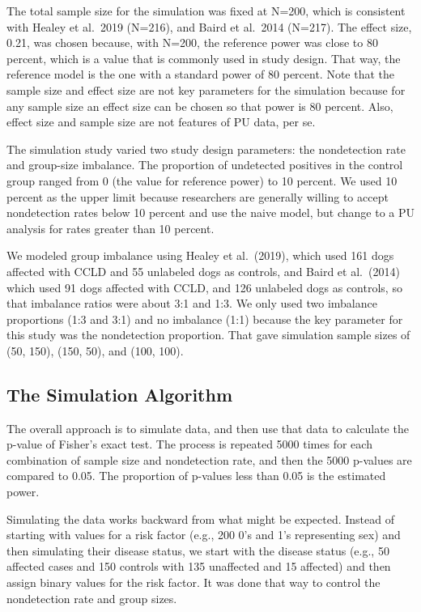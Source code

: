 \documentclass[
]{article}
\begin{document}
The total sample size for the simulation was fixed at N=200, which is
consistent with Healey et al.~2019 (N=216), and Baird et al.~2014
(N=217).\cite{bcioa14, hmhcbhkr19} The effect size, 0.21, was chosen
because, with N=200, the reference power was close to 80 percent, which
is a value that is commonly used in study design. That way, the
reference model is the one with a standard power of 80 percent. Note
that the sample size and effect size are not key parameters for the
simulation because for any sample size an effect size can be chosen so
that power is 80 percent. Also, effect size and sample size are not
features of PU data, per se.

The simulation study varied two study design parameters: the
nondetection rate and group-size imbalance. The proportion of undetected
positives in the control group ranged from 0 (the value for reference
power) to 10 percent. We used 10 percent as the upper limit because
researchers are generally willing to accept nondetection rates below 10
percent and use the naive model, but change to a PU analysis for rates
greater than 10 percent.\cite{bd20}

We modeled group imbalance using Healey et al.~(2019), which used 161
dogs affected with CCLD and 55 unlabeled dogs as controls, and Baird et
al.~(2014) which used 91 dogs affected with CCLD, and 126 unlabeled dogs
as controls, so that imbalance ratios were about 3:1 and
1:3.\cite{bcioa14, hmhcbhkr19} We only used two imbalance proportions
(1:3 and 3:1) and no imbalance (1:1) because the key parameter for this
study was the nondetection proportion. That gave simulation sample sizes
of (50, 150), (150, 50), and (100, 100).

\hypertarget{the-simulation-algorithm}{%
\subsection{The Simulation Algorithm}\label{the-simulation-algorithm}}

The overall approach is to simulate data, and then use that data to
calculate the p-value of Fisher's exact test. The process is repeated
5000 times for each combination of sample size and nondetection rate,
and then the 5000 p-values are compared to 0.05. The proportion of
p-values less than 0.05 is the estimated power.

Simulating the data works backward from what might be expected. Instead
of starting with values for a risk factor (e.g., 200 0's and 1's
representing sex) and then simulating their disease status, we start
with the disease status (e.g., 50 affected cases and 150 controls with
135 unaffected and 15 affected) and then assign binary values for the
risk factor. It was done that way to control the nondetection rate and
group sizes.
\end{document}
